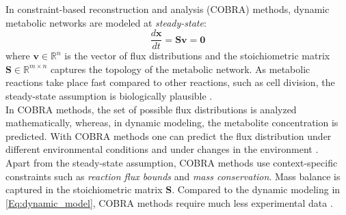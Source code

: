 In constraint-based reconstruction and analysis (COBRA) methods, dynamic metabolic networks are modeled at \textit{steady-state}: 
\begin{equation*}
    \frac{d \mathbf x}{dt} = \mathbf S \mathbf v= \mathbf 0 
\end{equation*} 
 where $\mathbf v \in \mathbb{R}^n$ is the vector of flux distributions and the stoichiometric matrix $\mathbf S \in \mathbb{R}^{m \times n}$ captures the topology of the metabolic network. As metabolic reactions take place fast compared to other reactions, such as cell division, the steady-state assumption is biologically plausible \cite{enumerate_extreme_rays}. \\ 
In COBRA methods, the set of possible flux distributions is analyzed mathematically, whereas, in dynamic modeling, the metabolite concentration is predicted. With COBRA methods one can predict the flux distribution under different environmental conditions and under changes in the environment \cite{intro_computational_systems_biology}.
\\
Apart from the steady-state assumption, COBRA methods use context-specific constraints such as \textit{reaction flux bounds} and \textit{mass conservation}. %
Mass balance is captured in the stoichiometric matrix $\mathbf S$. 
Compared to the dynamic modeling in \cref{Eq:dynamic_model}, COBRA methods require much less experimental data \cite{intro_computational_systems_biology}.

